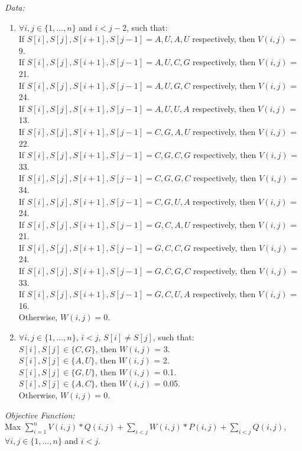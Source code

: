\documentclass[11pt]{article}
\begin{document}
{\begin{enumerate}
\textit{Data:}
\begin{enumerate}
    \item $\forall i,j \in \{1,\dots, n\}$ and $i<j-2$, such that:\\
    If $S[i],S[j],S[i+1],S[j-1] = A,U,A,U$ respectively, then $V(i,j)$ = 9.\\
    If $S[i],S[j],S[i+1],S[j-1] = A,U,C,G$ respectively, then $V(i,j)$ = 21.\\
    If $S[i],S[j],S[i+1],S[j-1] = A,U,G,C$ respectively, then $V(i,j)$ = 24.\\
    If $S[i],S[j],S[i+1],S[j-1] = A,U,U,A$ respectively, then $V(i,j)$ = 13.\\
    If $S[i],S[j],S[i+1],S[j-1] = C,G,A,U$ respectively, then $V(i,j)$ = 22.\\
    If $S[i],S[j],S[i+1],S[j-1] = C,G,C,G$ respectively, then $V(i,j)$ = 33.\\
    If $S[i],S[j],S[i+1],S[j-1] = C,G,G,C$ respectively, then $V(i,j)$ = 34.\\
    If $S[i],S[j],S[i+1],S[j-1] = C,G,U,A$ respectively, then $V(i,j)$ = 24.\\
    If $S[i],S[j],S[i+1],S[j-1] = G,C,A,U$ respectively, then $V(i,j)$ = 21.\\
    If $S[i],S[j],S[i+1],S[j-1] = G,C,C,G$ respectively, then $V(i,j)$ = 24.\\
    If $S[i],S[j],S[i+1],S[j-1] = G,C,G,C$ respectively, then $V(i,j)$ = 33.\\
    If $S[i],S[j],S[i+1],S[j-1] = G,C,U,A$ respectively, then $V(i,j)$ = 16.\\
    Otherwise, $W(i,j) = 0$.\\
    \item $\forall i,j \in \{1,\dots, n\}$, $i<j$, $S[i]\neq S[j]$, such that:\\
    $S[i],S[j] \in \{C,G\}$, then $W(i,j)$ = 3.\\
    $S[i],S[j] \in \{A,U\}$, then $W(i,j)$ = 2.\\
    $S[i],S[j] \in \{G,U\}$, then $W(i,j)$ = 0.1.\\
    $S[i],S[j] \in \{A,C\}$, then $W(i,j)$ = 0.05.\\
    Otherwise, $W(i,j) = 0$.\\
\end{enumerate}

\textit{Objective Function:}\\
Max $\sum_{i=1}^{n}V(i,j)*Q(i,j)+\sum_{i<j}W(i,j)*P(i,j)+\sum_{i<j}Q(i,j)$, $\forall i,j\in \{1,\dots, n\}$ and $i<j$.\\


\end{enumerate}}
\end{document}
